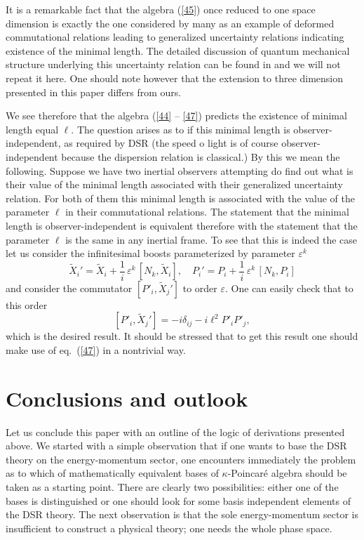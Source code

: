 \documentclass [prd,twocolumn,nofootinbib,showpacs]  {revtex4}
\begin{document}
It is a remarkable fact that the algebra (\ref{45}) once reduced
to one space dimension is exactly the  one considered by many as
an example of deformed commutational relations leading to
generalized uncertainty relations indicating existence of the
minimal length. The detailed discussion of quantum mechanical
structure underlying this uncertainty relation can be found in
\cite{kmm} and we will not repeat it here. One should note however
that the extension to three dimension  presented in this paper
differs from ours.

We see therefore that the algebra (\ref{44} -- \ref{47}) predicts
the existence of minimal  length equal $\ell$.  The question
arises as to if this minimal length is  observer-independent, as
required by DSR (the speed o light is of course
observer-independent because the dispersion relation is
classical.) By this we mean the following. Suppose we have two
inertial observers attempting do find out what is their value of
the minimal length associated with their generalized uncertainty
relation. For both of them this minimal length is associated with
the value of the parameter $\ell$ in their commutational
relations. The statement that the minimal length is
observer-independent is equivalent therefore with the statement
that the parameter $\ell$ is the same in any inertial frame. To
see that this is indeed the case let us consider the infinitesimal
boosts parameterized by parameter $\varepsilon^k$
$$
\tilde{X}_i' = \tilde{X}_i + \frac1i\,\varepsilon^k\, [N_k,
\tilde{X}_i], \quad P_i' = P_i +  \frac1i\,\varepsilon^k\, [N_k,
P_i]
$$
and consider the commutator $[P'_i, \tilde{X}_j']$ to order $\varepsilon$.
One can easily check that to this order
\begin{equation}\label{52}
 [P'_i, \tilde{X}_j'] = - i \delta_{ij} - i \ell^2 P'_i P'_j,
\end{equation}
which is the desired result. It should be stressed that to get
this result one should make use of  eq.~(\ref{47}) in a nontrivial
way.

\section{Conclusions and outlook}

Let us conclude this paper with an outline of the logic of
derivations presented above. We started  with a simple observation
that if one wants to base the DSR theory on the energy-momentum
sector, one encounters immediately the problem as to which of
mathematically equivalent bases of  $\kappa$-Poincar\'e algebra
should be taken as a starting point. There are clearly two
possibilities: either one of the bases is distinguished or one
should look for some basis independent elements of the DSR theory.
The next observation is that  the sole energy-momentum sector is
insufficient to construct a physical theory; one needs the whole
phase space.
\end{document}
